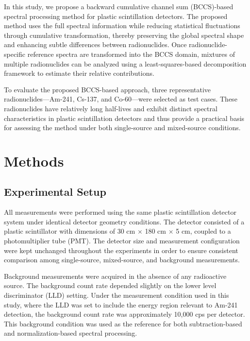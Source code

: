 \documentclass[fleqn, 10pt]{wlscirep}
\begin{document}
In this study, we propose a backward cumulative channel sum (BCCS)-based spectral processing method for plastic scintillation detectors. The proposed method uses the full spectral information while reducing statistical fluctuations through cumulative transformation, thereby preserving the global spectral shape and enhancing subtle differences between radionuclides. Once radionuclide-specific reference spectra are transformed into the BCCS domain, mixtures of multiple radionuclides can be analyzed using a least-squares-based decomposition framework to estimate their relative
contributions.


To evaluate the proposed BCCS-based approach, three representative radionuclides—Am-241, Cs-137, and Co-60—were selected as test cases. These radionuclides have relatively long half-lives and exhibit distinct spectral characteristics in plastic scintillation detectors and thus provide a practical basis for assessing the method under both single-source and mixed-source conditions.

\section*{Methods}
\subsection*{Experimental Setup}

All measurements were performed using the same plastic scintillation detector system under identical detector geometry conditions. The detector consisted of a plastic scintillator
with dimensions of 30 cm $\times$ 180 cm $\times$ 5 cm, coupled to a photomultiplier tube (PMT). The
detector size and measurement configuration were kept unchanged throughout the experiments in order to ensure consistent comparison among single-source, mixed-source, and background measurements.

Background measurements were acquired in the absence of any radioactive source. The background count rate depended slightly on the lower level discriminator (LLD) setting. Under the measurement condition used in this study, where the LLD was set to include the energy region relevant to Am-241 detection, the background count rate was approximately 10,000 cps per detector. This background condition was used as the reference for both subtraction-based and normalization-based spectral processing.
\end{document}
